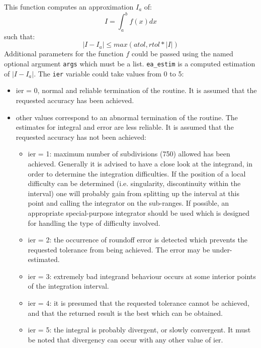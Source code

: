 \begin{mandescription}
This function computes an approximation $I_a$ of:
$$
   I = \int_a^b f(x) dx
$$
such that:
$$
   | I - I_a | \le  max(atol, rtol*|I|)
$$
Additional parameters for the function $f$ could be passed using the
named optional argument \verb+args+ which must be a
list. \verb+ea_estim+ is a computed estimation of $| I - I_a |$. The
\verb+ier+ variable could take values from 0 to 5: 
\begin{itemize}
\item ier = 0,  normal and reliable termination of the routine. It is assumed that the
      requested  accuracy has been achieved.
\item other values correspond to an abnormal termination of the routine. The estimates
      for integral and error are less reliable. It is assumed that the  requested accuracy
      has not been achieved:
      \begin{itemize}
      \item ier = 1: maximum number of subdivisions (750) allowed has been achieved. Generally
            it is advised to have a close look at the
            integrand, in order to determine the integration
            difficulties. If the position of a local difficulty can
            be determined (i.e.  singularity, discontinuity within
            the interval) one will probably gain from  splitting up
            the interval at this point and calling the integrator
            on the sub-ranges. If possible, an appropriate
            special-purpose integrator should be used which is
            designed for handling the type  of difficulty involved.
      \item ier = 2: the occurrence of roundoff error is detected
            which prevents the requested tolerance from being
            achieved. The error may be under-estimated.
      \item ier = 3: extremely bad integrand behaviour occurs at 
            some interior points of the integration interval.
      \item ier = 4: it is presumed that the requested tolerance 
            cannot be achieved, and that the returned result is the
            best which can be obtained.
      \item ier = 5: the integral is probably divergent, or slowly
            convergent. It must be noted that divergency can occur with
            any other value of ier.
      \end{itemize}
\end{itemize}

\end{mandescription}

